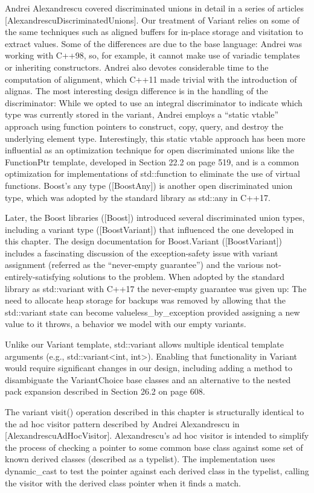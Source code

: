 Andrei Alexandrescu covered discriminated unions in detail in a series of articles [AlexandrescuDiscriminatedUnions]. Our treatment of Variant relies on some of the same techniques such as aligned buffers for in-place storage and visitation to extract values. Some of the differences are due to the base language: Andrei was working with C++98, so, for example, it cannot make use of variadic templates or inheriting constructors. Andrei also devotes considerable time to the computation of alignment, which C++11 made trivial with the introduction of alignas. The most interesting design difference is in the handling of the discriminator: While we opted to use an integral discriminator to indicate which type was currently stored in the variant, Andrei employs a “static vtable” approach using function pointers to construct, copy, query, and destroy the underlying element type. Interestingly, this static vtable approach has been more influential as an optimization technique for open discriminated unions like the FunctionPtr template, developed in Section 22.2 on page 519, and is a common optimization for implementations of std::function to eliminate the use of virtual functions. Boost’s any type ([BoostAny]) is another open discriminated union type, which was adopted by the standard library as std::any in C++17.

Later, the Boost libraries ([Boost]) introduced several discriminated union types, including a variant type ([BoostVariant]) that influenced the one developed in this chapter. The design documentation for Boost.Variant ([BoostVariant]) includes a fascinating discussion of the exception-safety issue with variant assignment (referred as the “never-empty guarantee”) and the various not-entirely-satisfying solutions to the problem. When adopted by the standard library as std::variant with C++17 the never-empty guarantee was given up: The need to allocate heap storage for backups was removed by allowing that the std::variant state can become valueless\_by\_exception provided assigning a new value to it throws, a behavior we model with our empty variants.

Unlike our Variant template, std::variant allows multiple identical template arguments (e.g., std::variant<int, int>). Enabling that functionality in Variant would require significant changes in our design, including adding a method to disambiguate the VariantChoice base classes and an alternative to the nested pack expansion described in Section 26.2 on page 608.

The variant visit() operation described in this chapter is structurally identical to the ad hoc visitor pattern described by Andrei Alexandrescu in [AlexandrescuAdHocVisitor]. Alexandrescu’s ad hoc visitor is intended to simplify the process of checking a pointer to some common base class against
some set of known derived classes (described as a typelist). The implementation uses dynamic\_cast to test the pointer against each derived class in the typelist, calling the visitor with the derived class pointer when it finds a match.



